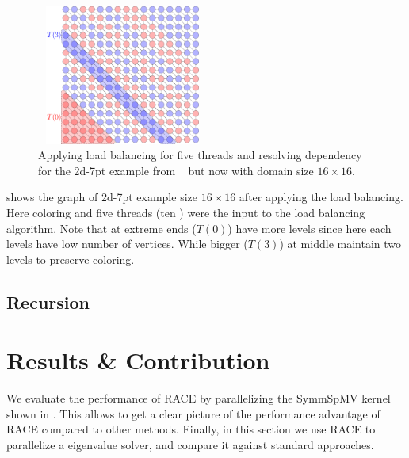   \setlength{\belowcaptionskip}{-10pt}
  \begin{figure}[t]
  	\begin{minipage}[c]{0.26\textwidth}
  	\includegraphics[height=12.4em,width=15.2em]{pics/race_method/load_balancing}
  	\end{minipage}\hspace{2.2em}
  	 \begin{minipage}[c]{0.16\textwidth}
  	\caption{\label{fig:lb} Applying load balancing for five threads and resolving \DTWO
  		dependency for the 2d-7pt example from ~ but now with domain size $16\times16$.  }
  	\end{minipage}
  \end{figure}
   \setlength{\belowcaptionskip}{0pt}
   
   shows the graph of 2d-7pt example size $16\times16$ after
   applying the load balancing. Here \DTWO coloring and five threads
    (\ie ten \levelGroups) were the input to the load balancing algorithm.
    Note that \levelGroups at extreme ends (\eg $T(0)$) have more levels
    since here each levels have low number of vertices. While bigger \levelGroups
    (\eg $T(3)$) at middle maintain two levels to preserve \DK coloring.
    
\subsection{Recursion}


\section{Results \& Contribution} \label{sec:results}
We evaluate the performance of \acrshort{RACE} by parallelizing the \acrshort{SymmSpMV}
kernel shown in . This allows to get a clear picture of the
performance advantage of \acrshort{RACE} compared to other methods. Finally,
in this section we use \acrshort{RACE} to parallelize a eigenvalue solver, 
and compare it against standard approaches.

